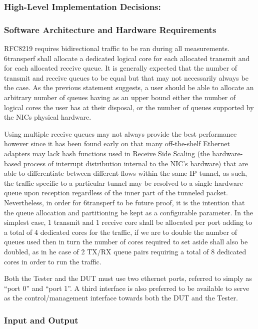 \documentclass[a4paper,12p,titlepage]{article}
\begin{document}
\subsubsection{High-Level Implementation Decisions:}
\subsubsection{Software Architecture and Hardware Requirements}

RFC8219 requires bidirectional traffic to be ran during all measurements. 6transperf shall allocate a dedicated logical core for each allocated transmit and for each allocated receive queue. It is generally expected that the number of transmit and receive queues to be equal but that may not necessarily always be the case. As the previous statement suggests, a user should be able to allocate an arbitrary number of queues having as an upper bound either the number of logical cores the user has at their disposal, or the number of queues supported by the NICs physical hardware.

Using multiple receive queues may not always provide the best performance however since it has been found early on that many off-the-shelf Ethernet adapters may lack hash functions used in Receive Side Scaling (the hardware-based process of interrupt distribution internal to the NIC’s hardware) that are able to differentiate between different flows within the same IP tunnel, as such, the traffic specific to a particular tunnel may be resolved to a single hardware queue upon reception regardless of the inner part of the tunneled packet. Nevertheless, in order for 6transperf to be future proof, it is the intention that the queue allocation and partitioning be kept as a configurable parameter. In the simplest case, 1 transmit and 1 receive core shall be allocated per port adding to a total of 4 dedicated cores for the traffic, if we are to double the number of queues used then in turn the number of cores required to set aside shall also be doubled, as in he case of 2 TX/RX queue pairs requiring a total of 8 dedicated cores in order to run the traffic.

Both the Tester and the DUT must use two ethernet ports, referred to simply as “port 0” and “port 1”. A third interface is also preferred to be available to serve as the control/management interface towards both the DUT and the Tester.

\subsubsection{Input and Output}
\end{document}
